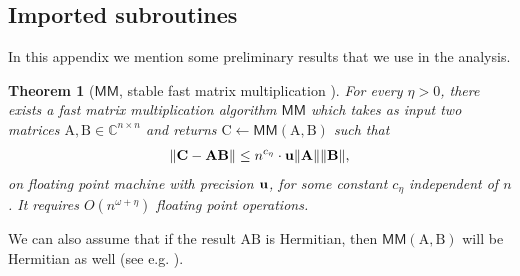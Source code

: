\documentclass{article}
\newtheorem{theorem}{Theorem}[section]
\newcommand\matA{\boldsymbol{\mathrm{A}}}
\newcommand\matB{\boldsymbol{\mathrm{B}}}
\newcommand\matC{\boldsymbol{\mathrm{C}}}
\newcommand{\umach}{\textbf{\textup{u}}}
\newcommand{\MM}{\mathsf{MM}}
\begin{document}
\subsection{Imported subroutines}
\label{appendix:tridiagonal_reduction_subroutines}
In this appendix we mention some preliminary results that we use in the analysis.
\begin{theorem}[$ \MM$, stable fast matrix multiplication \cite{demmel2007fastmm,demmel2007fastla}]
\label{theorem:fast_mm}
For every $\eta>0$, there exists a fast matrix multiplication algorithm $ \MM$ which takes as input two matrices $\matA,\matB\in\mathbb{C}^{n\times n}$ and returns $\matC\leftarrow  \MM(\matA,\matB)$ such that
\begin{align*}
    \|\matC-\matA\matB\| \leq n^{c_{\eta}}\cdot\umach\|\matA\|\|\matB\|,
\end{align*}
on floating point machine with precision $\umach$, for some constant $c_{\eta}$ independent of $n$. It requires $O(n^{\omega+\eta})$ floating point operations.
\end{theorem}
We can also assume that if the result $\matA\matB$ is Hermitian, then $\MM(\matA,\matB)$ will be Hermitian as well (see e.g. \cite{sobczyk2024invariant}).
\end{document}
